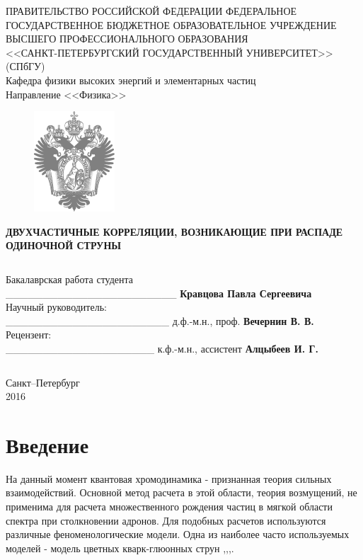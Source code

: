 \documentclass[12pt]{article}
\begin{document}
\begin{center}
\large{ПРАВИТЕЛЬСТВО РОССИЙСКОЙ ФЕДЕРАЦИИ}
\vspace{2em}
\large{ФЕДЕРАЛЬНОЕ ГОСУДАРСТВЕННОЕ БЮДЖЕТНОЕ ОБРАЗОВАТЕЛЬНОЕ УЧРЕЖДЕНИЕ ВЫСШЕГО ПРОФЕССИОНАЛЬНОГО ОБРАЗОВАНИЯ \\
<<САНКТ-ПЕТЕРБУРГСКИЙ ГОСУДАРСТВЕННЫЙ УНИВЕРСИТЕТ>>\\
(СПбГУ)\\}
Кафедра физики высоких энергий и элементарных частиц\\
Направление <<Физика>>
\end{center}
\begin{figure}[h!]
\center
\includegraphics[width=.25\textwidth,clip]{eagle2.png}
\end{figure}

\begin{center}
\large{\bf ДВУХЧАСТИЧНЫЕ КОРРЕЛЯЦИИ, ВОЗНИКАЮЩИЕ ПРИ РАСПАДЕ ОДИНОЧНОЙ СТРУНЫ}
\end{center}
$$$$
$$$$
\begin{flushright}
Бакалаврская работа студента
$$$$
\_\_\_\_\_\_\_\_\_\_\_\_\_\_\_\_\_\_\_\_\_\_\_  {\bf Кравцова Павла Сергеевича} \\
\vspace{2em}
Научный руководитель: \\
\_\_\_\_\_\_\_\_\_\_\_\_\_\_\_\_\_\_\_\_\_\_  д.ф.-м.н., проф. {\bf Вечернин В. В.} \\
\vspace{2em}
Рецензент: \\
\_\_\_\_\_\_\_\_\_\_\_\_\_\_\_\_\_\_\_\_  к.ф.-м.н., ассистент {\bf Алцыбеев И. Г.} \\
\end{flushright}
$$$$

\begin{center}
\Large{
Санкт--Петербург \\
2016}
\end{center}
\thispagestyle{empty}
\newpage


\tableofcontents
\newpage

\section{Введение}
\qquad На данный момент квантовая хромодинамика - признанная теория сильных взаимодействий. Основной метод расчета в этой области, теория возмущений, не применима для расчета множественного рождения частиц в мягкой области спектра при столкновении адронов. Для подобных расчетов используются различные феноменологические модели. Одна из наиболее часто используемых моделей - модель цветных кварк-глюонных струн \cite{model1},\cite{model2},\cite{model3},\cite{model4}.
\end{document}
